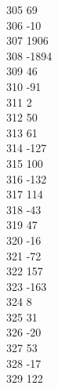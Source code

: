 { 305	69 \\
 306	-10 \\
 307	1906 \\
 308	-1894 \\
 309	46 \\
 310	-91 \\
 311	2 \\
 312	50 \\
 313	61 \\
 314	-127 \\
 315	100 \\
 316	-132 \\
 317	114 \\
 318	-43 \\
 319	47 \\
 320	-16 \\
 321	-72 \\
 322	157 \\
 323	-163 \\
 324	8 \\
 325	31 \\
 326	-20 \\
 327	53 \\
 328	-17 \\
 329	122 \\
}

